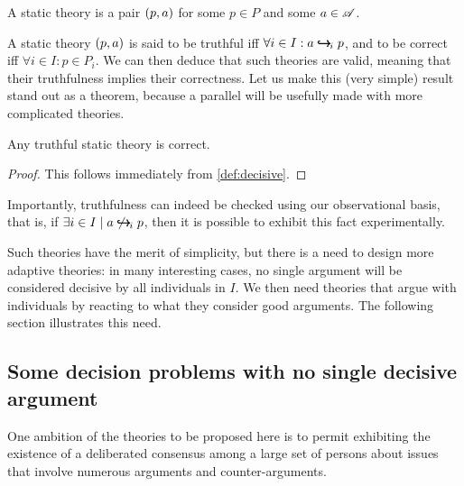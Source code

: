\documentclass[version=last, pagesize, twoside=off, bibliography=totoc, DIV=calc, fontsize=12pt, a4paper, french, english]{scrartcl}
\begin{document}
\begin{definition}
	\label{def:static}
	A static theory is a pair $(p, \ar)$ for some $p \in P$ and some $\ar \in \allargs$.
\end{definition}
A static theory $(p, \ar)$ is said to be truthful iff $\forall i \in I: \ar \ileadstost p$, and to be correct iff $\forall i \in I: p \in P_i$.
We can then deduce that such theories are valid, meaning that their truthfulness implies their correctness. Let us make this (very simple) result stand out as a theorem, because a parallel will be usefully made with more complicated theories.
\begin{theorem}
	Any truthful static theory is correct.
\end{theorem}
\begin{proof}
	This follows immediately from \cref{def:decisive}.
\end{proof}
Importantly, truthfulness can indeed be checked using our observational basis, that is, if $\exists i \in I \suchthat \ar \nileadstost p$, then it is possible to exhibit this fact experimentally.

Such theories have the merit of simplicity, but there is a need to design more adaptive theories: in many interesting cases, no single argument will be considered decisive by all individuals in $I$. We then need theories that argue with individuals by reacting to what they consider good arguments. The following section illustrates this need.

\subsection{Some decision problems with no single decisive argument}
\label{sec:lichtenstein}
One ambition of the theories to be proposed here is to permit exhibiting the existence of a deliberated consensus among a large set of persons about issues that involve numerous arguments and counter-arguments.
\end{document}
